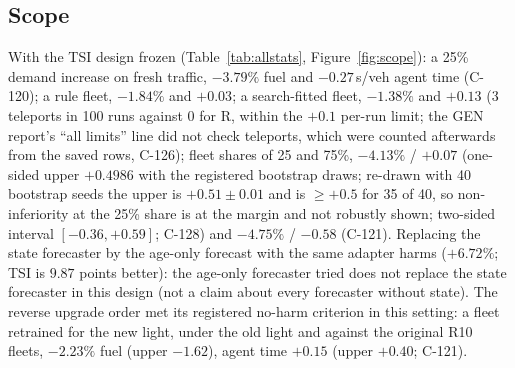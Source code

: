 \documentclass[11pt]{article}
\begin{document}
\subsection{Scope}
With the TSI design frozen (Table~\ref{tab:allstats}, Figure~\ref{fig:scope}): a 25\% demand increase on fresh traffic, $-3.79\%$ fuel and $-0.27$\,s/veh agent
time (C-120); a rule fleet, $-1.84\%$ and $+0.03$; a search-fitted fleet, $-1.38\%$ and $+0.13$ (3 teleports in 100 runs against 0 for R, within the $+0.1$ per-run limit; the GEN report's ``all limits'' line did not check teleports, which were counted afterwards from the saved rows, C-126); fleet shares of 25 and 75\%, $-4.13\%$
/ $+0.07$ (one-sided upper $+0.4986$ with the registered bootstrap draws; re-drawn with 40 bootstrap seeds the upper is
$+0.51\pm0.01$ and is $\ge+0.5$ for 35 of 40, so non-inferiority at the 25\% share is at the margin and not robustly shown; two-sided
interval $[-0.36, +0.59]$; C-128) and $-4.75\%$ / $-0.58$ (C-121). Replacing the state forecaster by the age-only forecast with the same
adapter harms ($+6.72\%$; TSI is $9.87$ points better): the age-only forecaster tried does not replace the state forecaster in this
design (not a claim about every forecaster without state). The reverse upgrade order met its registered no-harm criterion
in this setting: a fleet retrained for the new light, under the old light and against the original R10
fleets, $-2.23\%$ fuel (upper $-1.62$), agent time $+0.15$ (upper $+0.40$; C-121).
\end{document}
